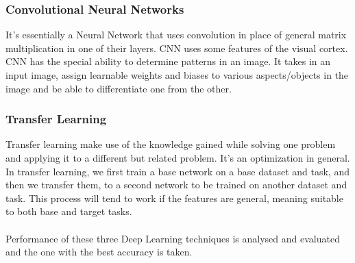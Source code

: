 \subsubsection{Convolutional Neural Networks}
It's essentially a Neural Network that uses convolution in place of general matrix multiplication in one of their layers.
CNN uses some features of the visual cortex.
CNN has the special ability to determine patterns in an image.
It takes in an input image, assign learnable weights and biases to various aspects/objects in the image and be able to differentiate one from the other.
\subsubsection{Transfer Learning}
Transfer learning make use of the knowledge gained while solving one problem and applying it to a different but related problem. It's an optimization in general.\\
In transfer learning, we first train a base network on a base dataset and task, and then we transfer them, to a second network to be trained on another dataset and task. This process will tend to work if the features are general, meaning suitable to both base and target tasks.\\ \\
Performance of these three Deep Learning techniques is analysed and evaluated and the one with the best accuracy is taken.
